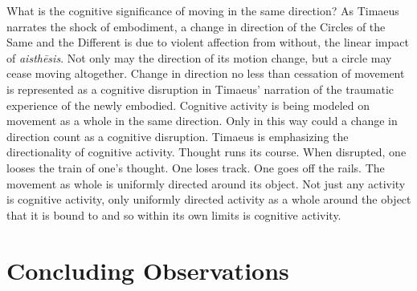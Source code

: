What is the cognitive significance of moving in the same direction? As Timaeus narrates the shock of embodiment, a change in direction of the Circles of the Same and the Different is due to violent affection from without, the linear impact of \emph{aisthēsis}. Not only may the direction of its motion change, but a circle may cease moving altogether. Change in direction no less than cessation of movement is represented as a cognitive disruption in Timaeus' narration of the traumatic experience of the newly embodied. Cognitive activity is being modeled on movement as a whole in the same direction. Only in this way could a change in direction count as a cognitive disruption. Timaeus is emphasizing the directionality of cognitive activity. Thought runs its course. When disrupted, one looses the train of one's thought. One loses track. One goes off the rails. The movement as whole is uniformly directed around its object. Not just any activity is cognitive activity, only uniformly directed activity as a whole around the object that it is bound to and so within its own limits is cognitive activity.


  



\section{Concluding Observations} %
\label{sec:concluding_observations_cr}





